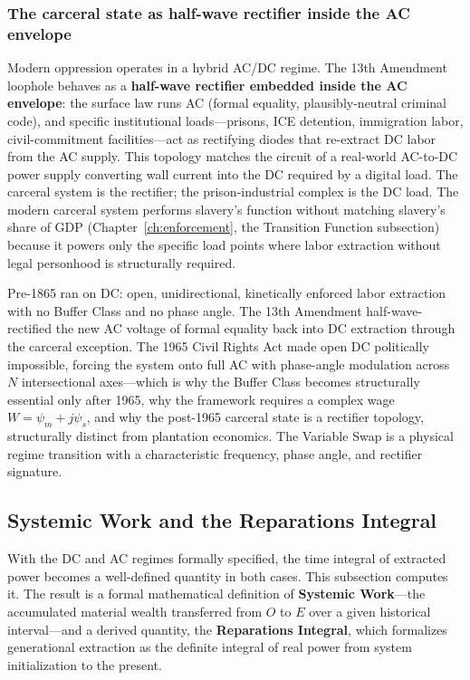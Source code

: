 \subsubsection*{The carceral state as half-wave rectifier inside the AC envelope}

Modern oppression operates in a hybrid AC/DC regime. The 13th Amendment loophole
behaves as a \textbf{half-wave rectifier embedded inside the AC
envelope}: the surface law runs AC (formal equality, plausibly-neutral
criminal code), and specific institutional loads---prisons, ICE
detention, immigration labor, civil-commitment facilities---act as
rectifying diodes that re-extract DC labor from the AC supply. This
topology matches the circuit of a real-world AC-to-DC power supply
converting wall current into the DC required by a digital load. The
carceral system is the rectifier; the prison-industrial complex is the
DC load. The modern carceral system performs slavery's function without
matching slavery's share of GDP (Chapter~\ref{ch:enforcement}, the Transition
Function subsection) because it powers only the specific load points where
labor extraction without legal personhood is structurally required.

\begin{keyinsight}
Pre-1865 ran on DC: open, unidirectional, kinetically enforced labor
extraction with no Buffer Class and no phase angle. The 13th Amendment
half-wave-rectified the new AC voltage of formal equality back into DC
extraction through the carceral exception. The 1965 Civil Rights Act
made open DC politically impossible, forcing the system onto full AC
with phase-angle modulation across $N$ intersectional axes---which is
why the Buffer Class becomes structurally essential only after 1965,
why the framework requires a complex wage $W = \psi_m + j\psi_s$, and
why the post-1965 carceral state is a rectifier topology, structurally distinct from
plantation economics. The Variable Swap is a physical regime transition with a
characteristic frequency, phase angle, and rectifier signature.
\end{keyinsight}

\subsection{Systemic Work and the Reparations Integral}
\label{subsec:systemic_work}

With the DC and AC regimes formally specified, the time integral of
extracted power becomes a well-defined quantity in both cases. This
subsection computes it. The result is a formal mathematical definition
of \textbf{Systemic Work}---the accumulated material wealth transferred
from $O$ to $E$ over a given historical interval---and a derived
quantity, the \textbf{Reparations Integral}, which formalizes
generational extraction as the definite integral of real power from
system initialization to the present.

